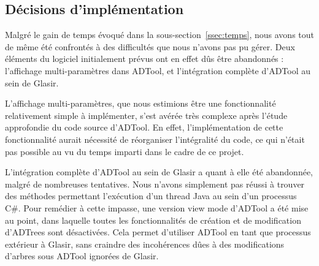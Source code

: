 \subsection{Décisions d'implémentation}
\label{sec:decisions}

Malgré le gain de temps évoqué dans la {\sc sous-section}~\ref{ssec:temps}, nous avons tout de même été confrontés à des difficultés que nous n'avons pas pu gérer. Deux éléments du logiciel initialement prévus ont en effet dûs être abandonnés : l'affichage multi-paramètres dans ADTool, et l'intégration complète d'ADTool au sein de Glasir.

L'affichage multi-paramètres, que nous estimions être une fonctionnalité relativement simple à implémenter, s'est avérée très complexe après l'étude approfondie du code source d'ADTool. En effet, l'implémentation de cette fonctionnalité aurait nécessité de réorganiser l'intégralité du code, ce qui n'était pas possible au vu du temps imparti dans le cadre de ce projet. 

L'intégration complète d'ADTool au sein de Glasir a quant à elle été abandonnée, malgré de nombreuses tentatives. Nous n'avons simplement pas réussi à trouver des méthodes permettant l'exécution d'un thread Java au sein d'un processus C\#. Pour remédier à cette impasse, une version \og view mode \fg d'ADTool a été mise au point, dans laquelle toutes les fonctionnalités de création et de modification d'ADTrees sont désactivées. Cela permet d'utiliser ADTool en tant que processus extérieur à Glasir, sans craindre des incohérences dûes à des modifications d'arbres sous ADTool ignorées de Glasir.  

